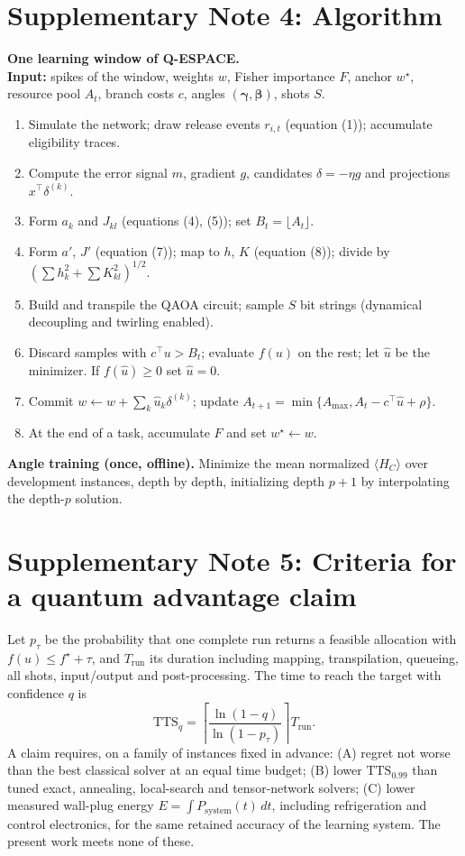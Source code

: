 \documentclass[11pt,a4paper]{article}
\begin{document}
\section*{Supplementary Note 4: Algorithm}
\textbf{One learning window of Q-ESPACE.}\\
\textbf{Input:} spikes of the window, weights $w$, Fisher importance $F$, anchor $w^\star$, resource pool $A_t$, branch costs $c$, angles $(\boldsymbol\gamma,\boldsymbol\beta)$, shots $S$.
\begin{enumerate}\setlength{\itemsep}{0pt}
\item Simulate the network; draw release events $r_{i,t}$ (equation (1)); accumulate eligibility traces.
\item Compute the error signal $m$, gradient $g$, candidates $\delta=-\eta g$ and projections $x^{\top}\delta^{(k)}$.
\item Form $a_k$ and $J_{kl}$ (equations (4), (5)); set $B_t=\lfloor A_t\rfloor$.
\item Form $a'$, $J'$ (equation (7)); map to $h$, $K$ (equation (8)); divide by $(\sum h_k^2+\sum K_{kl}^2)^{1/2}$.
\item Build and transpile the QAOA circuit; sample $S$ bit strings (dynamical decoupling and twirling enabled).
\item Discard samples with $c^{\top}u>B_t$; evaluate $f(u)$ on the rest; let $\hat u$ be the minimizer. If $f(\hat u)\ge0$ set $\hat u=0$.
\item Commit $w\leftarrow w+\sum_k\hat u_k\delta^{(k)}$; update $A_{t+1}=\min\{A_{\max},A_t-c^{\top}\hat u+\rho\}$.
\item At the end of a task, accumulate $F$ and set $w^\star\leftarrow w$.
\end{enumerate}
\textbf{Angle training (once, offline).} Minimize the mean normalized $\langle H_C\rangle$ over development instances, depth by depth, initializing depth $p+1$ by interpolating the depth-$p$ solution.

\section*{Supplementary Note 5: Criteria for a quantum advantage claim}
Let $p_\tau$ be the probability that one complete run returns a feasible allocation with $f(u)\le f^\star+\tau$, and $T_{\mathrm{run}}$ its duration including mapping, transpilation, queueing, all shots, input/output and post-processing. The time to reach the target with confidence $q$ is
\begin{equation}
\mathrm{TTS}_q=\left\lceil\frac{\ln(1-q)}{\ln(1-p_\tau)}\right\rceil T_{\mathrm{run}} .
\end{equation}
A claim requires, on a family of instances fixed in advance: (A) regret not worse than the best classical solver at an equal time budget; (B) lower $\mathrm{TTS}_{0.99}$ than tuned exact, annealing, local-search and tensor-network solvers; (C) lower measured wall-plug energy $E=\int P_{\mathrm{system}}(t)\,dt$, including refrigeration and control electronics, for the same retained accuracy of the learning system. The present work meets none of these.
\end{document}
